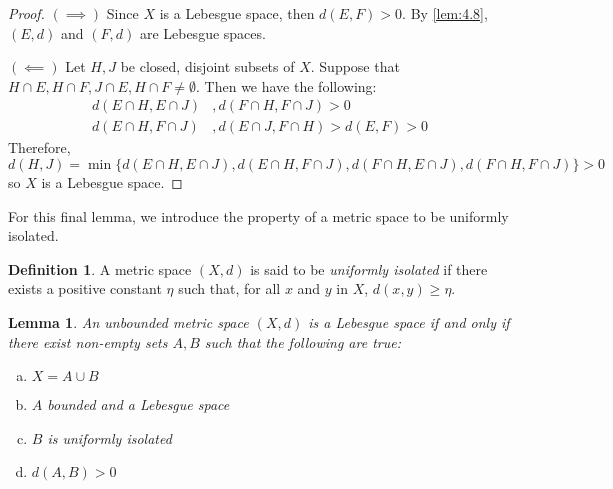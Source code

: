 \documentclass[openany, amssymb, psamsfonts]{amsart}
\let\fullref\autoref
\newtheorem{lem}{Lemma}[section]
\theoremstyle{definition}
\newtheorem{defn}{Definition}[section]
\numberwithin{equation}{section}
\begin{document}
\begin{proof}
  $(\implies)$ Since $X$ is a Lebesgue space, then $d(E,F) > 0$. By \fullref{lem:4.8}, $(E,d)$ and $(F,d)$ are Lebesgue spaces. 

  $(\impliedby)$ Let $H, J$ be closed, disjoint subsets of $X$. Suppose that $H \cap E, H \cap F, J \cap E, H \cap F \neq \emptyset$. Then we have the following:
  \begin{align*}
    d(E\cap H, E\cap J)&, d(F\cap H, F\cap J) > 0\\
    d(E \cap H, F \cap J)&, d(E \cap J, F \cap H) > d(E, F) > 0
  \end{align*}
  Therefore, 
  $$d(H, J) = \min\{d(E\cap H, E \cap J), d(E \cap H, F \cap J), d(F \cap H, E \cap J), d(F \cap H, F \cap J) \} > 0$$ 
  so $X$ is a Lebesgue space.
\end{proof}
For this final lemma, we introduce the property of a metric space to be uniformly isolated.
\begin{defn}
  A metric space $(X,d)$ is said to be \emph{uniformly isolated} if there exists a positive constant $\eta$ such that, for all $x$ and $y$ in $X$, $d(x,y) \ge \eta$. 
\end{defn}
\begin{lem}\label{lem:4.9}
  An unbounded metric space $(X,d)$ is a Lebesgue space if and only if there exist non-empty sets $A,B$ such that the following are true:
  \begin{enumerate}[(a)]
    \item $X = A \cup B$ \label{4.9.a}
    \item $A$ bounded and a Lebesgue space \label{4.9.b}
    \item $B$ is uniformly isolated \label{4.9.c}
    \item $d(A,B) > 0$ \label{4.9.d}
  \end{enumerate}
\end{lem}
\end{document}
